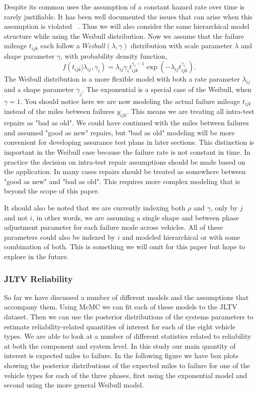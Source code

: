 \documentclass[12pt]{article}
\begin{document}
Despite its common uses the assumption of a constant hazard rate over time is
rarely justifiable.  It has been well documented the issues that can arise when
this assumption is violated ~\cite{ref2}.  Thus we will also consider the same
hierarchical model structure while using the Weibull distribution.  Now we
assume that the failure mileage $t_{ijk}$ each follow a $Weibull(\lambda, \gamma)$
distribution with scale parameter $\lambda$ and shape parameter $\gamma$, with
probability density function,
\begin{equation*}
    f(t_{ijk}|\lambda_{ij},\gamma_{i})=\lambda_{ij}\gamma_{i}
    t_{ijk}^{\gamma_{i}-1}\exp(-\lambda_{ij} t_{ijk}^{\gamma_{i}}).
\end{equation*}
The Weibull distribution is a more flexible model with both a rate parameter
$\lambda_{ij}$ and a shape parameter $\gamma_{j}$.  The exponential is a special
case of the Weibull, when $\gamma = 1$.  You should notice here we are now
modeling the actual failure mileage $t_{ijk}$ instead of the miles between
failures $y_{ijk}$.  This means we are treating all intra-test repairs as "bad
as old".  We could have continued with the miles between failures and assumed
"good as new" repairs, but "bad as old" modeling will be more convenient for
developing assurance test plans in later sections.  This distinction is
important in the Weibull case because the failure rate is not constant in time.
In practice the decision on intra-test repair assumptions should be made based
on the application.  In many cases repairs should be treated as somewhere
between "good as new" and "bad as old".  This requires more complex modeling
that is beyond the scope of this paper.

It should  also be noted that we are currently indexing both $\rho$ and
$\gamma$, only by $j$ and not $i$, in other words, we are assuming a single
shape and between phase adjustment parameter for each failure mode across
vehicles.  All of these parameters could also be indexed by $i$ and modeled
hierarchical or with some combination of both.  This is something we will omit
for this paper but hope to explore in the future.

\subsubsection{JLTV Reliability}
So far we have discussed a number of different models and the assumptions that
accompany them.  Using McMC we can fit each of these models to the JLTV dataset.
Then we can use the posterior distributions of the systems parameters to
estimate reliability-related quantities of interest for each of the eight
vehicle types.  We are able to look at a number of different statistics related
to reliability at both  the component and system level.  In this study our main
quantity of interest is expected miles to  failure.  In the following figure we
have box plots showing the posterior distributions of  the expected miles to
failure for one of the vehicle types for each of the three phases, first using
the exponential model and second using the more general Weibull model.
\end{document}

